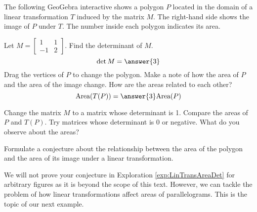 \documentclass{ximera}
\begin{document}
    \begin{exploration}\label{exp:LinTransAreaDet}
    The following GeoGebra interactive shows a polygon $P$ located in the domain of a linear transformation $T$ induced by the matrix $M$.  The right-hand side shows the image of $P$ under $T$.  The number inside each polygon indicates its area.
     
     
    \begin{onlineOnly}
    \begin{center}
    \end{center}
    \end{onlineOnly}
     
    \begin{question}
    Let $M=\begin{bmatrix}1&1\\-1&2\end{bmatrix}$.  Find the determinant of $M$.
    $$\det{M}=\answer{3}$$
    Drag the vertices of $P$ to change the polygon.  Make a note of how the area of $P$ and the area of the image change.  How are the areas related to each other?
    $$\mbox{Area}(T(P))=\answer{3}\mbox{Area}(P)$$
    \end{question}
    \begin{question}
    Change the matrix $M$ to a matrix whose determinant is 1.  Compare the areas of $P$ and $T(P)$.  Try matrices whose determinant is 0 or negative.  What do you observe about the areas?
     
    Formulate a conjecture about the relationship between the area of the polygon and the area of its image under a linear transformation.
    \end{question}
    \end{exploration}
    We will not prove your conjecture in Exploration \ref{exp:LinTransAreaDet} for arbitrary figures as it is beyond the scope of this text.  However, we can tackle the problem of how linear transformations affect areas of parallelograms.  This is the topic of our next example.
     
\end{document}
